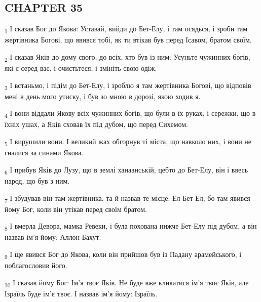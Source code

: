 \subsection{CHAPTER 35}
\begin{tcolorbox}
\textsubscript{1} І сказав Бог до Якова: Уставай, вийди до Бет-Елу, і там осядься, і зроби там жертівника Богові, що явився тобі, як ти втікав був перед Ісавом, братом своїм.
\end{tcolorbox}
\begin{tcolorbox}
\textsubscript{2} І сказав Яків до дому свого, до всіх, хто був із ним: Усуньте чужинних богів, які є серед вас, і очистьтеся, і змініть свою одіж.
\end{tcolorbox}
\begin{tcolorbox}
\textsubscript{3} І встаньмо, і підім до Бет-Елу, і зроблю я там жертівника Богові, що відповів мені в день мого утиску, і був зо мною в дорозі, якою ходив я.
\end{tcolorbox}
\begin{tcolorbox}
\textsubscript{4} І вони віддали Якову всіх чужинних богів, що були в їх руках, і сережки, що в їхніх ушах, а Яків сховав їх під дубом, що перед Сихемом.
\end{tcolorbox}
\begin{tcolorbox}
\textsubscript{5} І вирушили вони. І великий жах обгорнув ті міста, що навколо них, і вони не гналися за синами Якова.
\end{tcolorbox}
\begin{tcolorbox}
\textsubscript{6} І прибув Яків до Лузу, що в землі ханаанській, цебто до Бет-Елу, він і ввесь народ, що був з ним.
\end{tcolorbox}
\begin{tcolorbox}
\textsubscript{7} І збудував він там жертівника, та й назвав те місце: Ел Бет-Ел, бо там явився йому Бог, коли він утікав перед своїм братом.
\end{tcolorbox}
\begin{tcolorbox}
\textsubscript{8} І вмерла Девора, мамка Ревеки, і була похована нижче Бет-Елу під дубом, а він назвав ім'я йому: Аллон-Бахут.
\end{tcolorbox}
\begin{tcolorbox}
\textsubscript{9} І ще явився Бог до Якова, коли він прийшов був із Падану арамейського, і поблагословив його.
\end{tcolorbox}
\begin{tcolorbox}
\textsubscript{10} І сказав йому Бог: Ім'я твоє Яків. Не буде вже кликатися ім'я твоє Яків, але Ізраїль буде ім'я твоє. І назвав ім'я йому: Ізраїль.
\end{tcolorbox}
